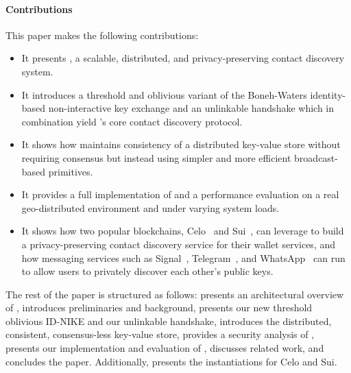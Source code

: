 \paragraph{Contributions}
This paper makes the following contributions:
\begin{itemize}
  \item It presents \sysname, a scalable, distributed, and privacy-preserving
    contact discovery system.
  \item It introduces a threshold and oblivious variant of the Boneh-Waters
    identity-based non-interactive key exchange and an unlinkable handshake
    which in combination yield \sysname's core contact discovery protocol.
  \item It shows how \sysname maintains consistency of a distributed key-value
    store without requiring consensus but instead using simpler and more
    efficient broadcast-based primitives.
  \item It provides a full implementation of \sysname and a performance
    evaluation on a real geo-distributed environment and under varying system
    loads.
  \item It shows how two popular blockchains, Celo~\cite{celo} and
    Sui~\cite{sui}, can leverage \sysname to build a privacy-preserving contact
    discovery service for their wallet services, and how messaging services
    such as Signal~\cite{signal}, Telegram~\cite{telegram}, and
    WhatsApp~\cite{whatsapp} can run \sysname to allow users to privately
    discover each other's public keys.
\end{itemize}
The rest of the paper is structured as follows:  presents an architectural overview of \sysname,  introduces preliminaries and background,  presents our new threshold oblivious ID-NIKE and our unlinkable handshake,  introduces the distributed, consistent, consensus-less \sysname key-value store,  provides a security analysis of \sysname,  presents our implementation and evaluation of \sysname,  discusses related work, and  concludes the paper. Additionally,  presents the \sysname instantiations for Celo and Sui.
